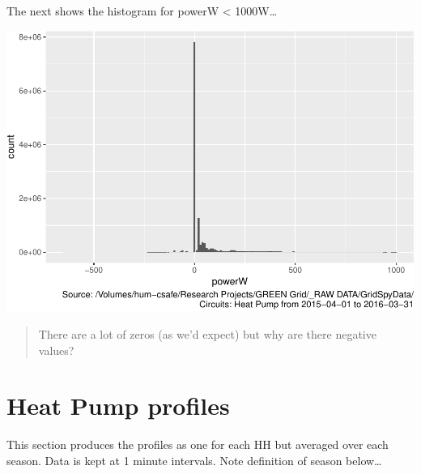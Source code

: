 \documentclass[]{article}
\begin{document}
The next shows the histogram for powerW \textless{} 1000W\ldots{}

\includegraphics{ggProfile_Heat Pump_2015-04-01_2016-03-31_files/figure-latex/histo power under 1000-1.pdf}

\begin{quote}
There are a lot of zeros (as we'd expect) but why are there negative
values?
\end{quote}

\section{Heat Pump profiles}\label{heat-pump-profiles}

This section produces the profiles as one for each HH but averaged over
each season. Data is kept at 1 minute intervals. Note definition of
season below\ldots{}
\end{document}
